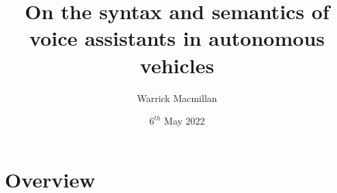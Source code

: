 \documentclass{beamer}
\title{On the syntax and semantics of voice assistants in autonomous vehicles}
\author{Warrick Macmillan}
\date{$6^{th}$ May 2022}
\begin{document}
\begin{frame}
  \titlepage
\end{frame}

\section{Overview}



% 

% 
\end{document}
